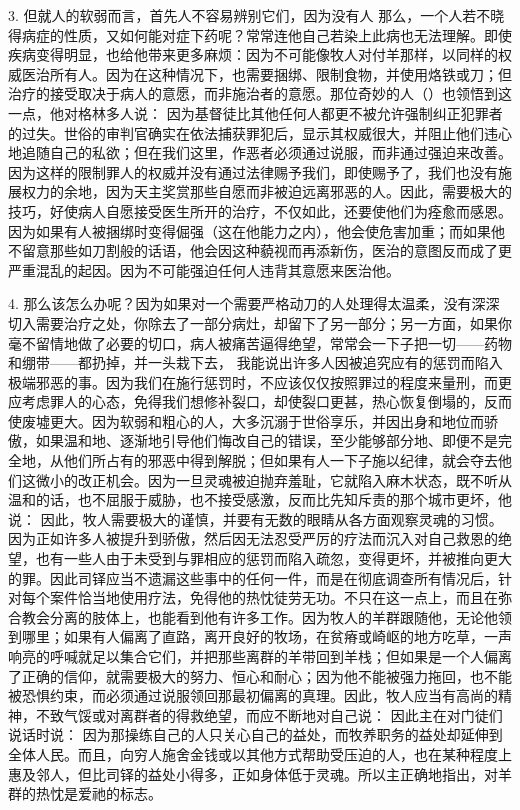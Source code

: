 3. 但就人的软弱而言，首先人不容易辨别它们，因为没有人  那么，一个人若不晓得病症的性质，又如何能对症下药呢？常常连他自己若染上此病也无法理解。即使疾病变得明显，也给他带来更多麻烦：因为不可能像牧人对付羊那样，以同样的权威医治所有人。因为在这种情况下，也需要捆绑、限制食物，并使用烙铁或刀；但治疗的接受取决于病人的意愿，而非施治者的意愿。那位奇妙的人（）也领悟到这一点，他对格林多人说：  因为基督徒比其他任何人都更不被允许强制纠正犯罪者的过失。世俗的审判官确实在依法捕获罪犯后，显示其权威很大，并阻止他们违心地追随自己的私欲；但在我们这里，作恶者必须通过说服，而非通过强迫来改善。因为这样的限制罪人的权威并没有通过法律赐予我们，即使赐予了，我们也没有施展权力的余地，因为天主奖赏那些自愿而非被迫远离邪恶的人。因此，需要极大的技巧，好使病人自愿接受医生所开的治疗，不仅如此，还要使他们为痊愈而感恩。因为如果有人被捆绑时变得倔强（这在他能力之内），他会使危害加重；而如果他不留意那些如刀割般的话语，他会因这种藐视而再添新伤，医治的意图反而成了更严重混乱的起因。因为不可能强迫任何人违背其意愿来医治他。\par

4. 那么该怎么办呢？因为如果对一个需要严格动刀的人处理得太温柔，没有深深切入需要治疗之处，你除去了一部分病灶，却留下了另一部分；另一方面，如果你毫不留情地做了必要的切口，病人被痛苦逼得绝望，常常会一下子把一切——药物和绷带——都扔掉，并一头栽下去， 我能说出许多人因被追究应有的惩罚而陷入极端邪恶的事。因为我们在施行惩罚时，不应该仅仅按照罪过的程度来量刑，而更应考虑罪人的心态，免得我们想修补裂口，却使裂口更甚，热心恢复倒塌的，反而使废墟更大。因为软弱和粗心的人，大多沉溺于世俗享乐，并因出身和地位而骄傲，如果温和地、逐渐地引导他们悔改自己的错误，至少能够部分地、即便不是完全地，从他们所占有的邪恶中得到解脱；但如果有人一下子施以纪律，就会夺去他们这微小的改正机会。因为一旦灵魂被迫抛弃羞耻，它就陷入麻木状态，既不听从温和的话，也不屈服于威胁，也不接受感激，反而比先知斥责的那个城市更坏，他说：  因此，牧人需要极大的谨慎，并要有无数的眼睛从各方面观察灵魂的习惯。因为正如许多人被提升到骄傲，然后因无法忍受严厉的疗法而沉入对自己救恩的绝望，也有一些人由于未受到与罪相应的惩罚而陷入疏忽，变得更坏，并被推向更大的罪。因此司铎应当不遗漏这些事中的任何一件，而是在彻底调查所有情况后，针对每个案件恰当地使用疗法，免得他的热忱徒劳无功。不只在这一点上，而且在弥合教会分离的肢体上，也能看到他有许多工作。因为牧人的羊群跟随他，无论他领到哪里；如果有人偏离了直路，离开良好的牧场，在贫瘠或崎岖的地方吃草，一声响亮的呼喊就足以集合它们，并把那些离群的羊带回到羊栈；但如果是一个人偏离了正确的信仰，就需要极大的努力、恒心和耐心；因为他不能被强力拖回，也不能被恐惧约束，而必须通过说服领回那最初偏离的真理。因此，牧人应当有高尚的精神，不致气馁或对离群者的得救绝望，而应不断地对自己说：  因此主在对门徒们说话时说：  因为那操练自己的人只关心自己的益处，而牧养职务的益处却延伸到全体人民。而且，向穷人施舍金钱或以其他方式帮助受压迫的人，也在某种程度上惠及邻人，但比司铎的益处小得多，正如身体低于灵魂。所以主正确地指出，对羊群的热忱是爱祂的标志。\par

